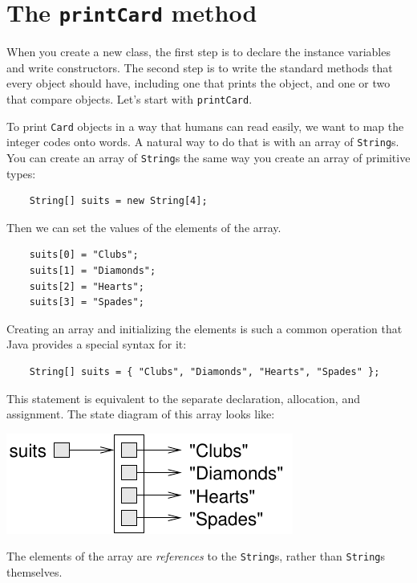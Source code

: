 \documentclass[12pt]{book}
\theoremstyle{exercise}
\begin{document}
\section{The {\tt printCard} method}
\label{printcard}

When you create a new class, the first step is to declare the
instance variables and write constructors.  The second step is
to write the standard methods that every object should have, including
one that prints the object, and one or two that compare objects.
Let's start with {\tt printCard}.


To print {\tt Card} objects in a way that humans
can read easily, we want to map the integer codes onto words.
A natural way to do that is with an array of {\tt String}s.  You
can create an array of {\tt String}s the same way you create an
array of primitive types:

\begin{lstlisting}
    String[] suits = new String[4];
\end{lstlisting}
%
Then we can set the values of the elements of the array.

\begin{lstlisting}
    suits[0] = "Clubs";
    suits[1] = "Diamonds";
    suits[2] = "Hearts";
    suits[3] = "Spades";
\end{lstlisting}
%
Creating an array and initializing the elements is such a common
operation that Java provides a special syntax for it:

\begin{lstlisting}
    String[] suits = { "Clubs", "Diamonds", "Hearts", "Spades" };
\end{lstlisting}
%
This statement is equivalent to the
separate declaration, allocation, and assignment.  The state
diagram of this array looks like:

\includegraphics{figs/stringarray.pdf}


The elements of the array are {\em references} to the {\tt String}s,
rather than {\tt String}s themselves.
\end{document}
